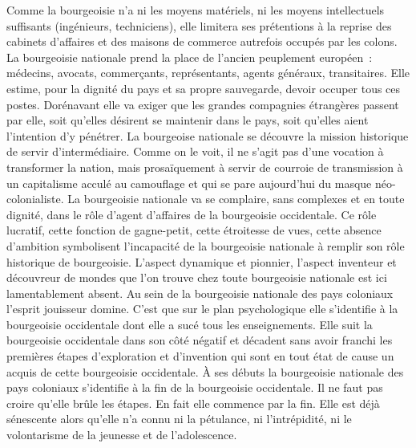 \documentclass[french,twoside]{book} %
\begin{document}
Comme la bourgeoisie n’a ni les moyens matériels, ni les moyens intellectuels suffisants (ingénieurs, techniciens), elle limitera ses prétentions à la reprise des cabinets d’affaires et des maisons de commerce autrefois occupés par les colons. La bourgeoisie nationale prend la place de l’ancien peuplement européen : médecins, avocats, commerçants, représentants, agents généraux, transitaires. Elle estime, pour la dignité du pays et sa propre sauvegarde, devoir occuper tous ces postes. Dorénavant elle va exiger que les grandes compagnies étrangères passent par elle, soit qu’elles désirent se maintenir dans le pays, soit qu’elles aient l’intention d’y pénétrer. La bourgeoise nationale se découvre la mission historique de servir d’intermédiaire. Comme on le voit, il ne s’agit pas d’une vocation à transformer   la nation, mais prosaïquement à servir de courroie de transmission à un capitalisme acculé au camouflage et qui se pare aujourd’hui du masque néo-colonialiste. La bourgeoisie nationale va se complaire, sans complexes et en toute dignité, dans le rôle d’agent d’affaires de la bourgeoisie occidentale. Ce rôle lucratif, cette fonction de gagne-petit, cette étroitesse de vues, cette absence d’ambition symbolisent l’incapacité de la bourgeoisie nationale à remplir son rôle historique de bourgeoisie. L’aspect dynamique et pionnier, l’aspect inventeur et découvreur de mondes que l’on trouve chez toute bourgeoisie nationale est ici lamentablement absent. Au sein de la bourgeoisie nationale des pays coloniaux l’esprit jouisseur domine. C’est que sur le plan psychologique elle s’identifie à la bourgeoisie occidentale dont elle a sucé tous les enseignements. Elle suit la bourgeoisie occidentale dans son côté négatif et décadent sans avoir franchi les premières étapes d’exploration et d’invention qui sont en tout état de cause un acquis de cette bourgeoisie occidentale. À ses débuts la bourgeoisie nationale des pays coloniaux s’identifie à la fin de la bourgeoisie occidentale. Il ne faut pas croire qu’elle brûle les étapes. En fait elle commence par la fin. Elle est déjà sénescente alors qu’elle n’a connu ni la pétulance, ni l’intrépidité, ni le volontarisme de la jeunesse et de l’adolescence.\par
\bigbreak
\end{document}
